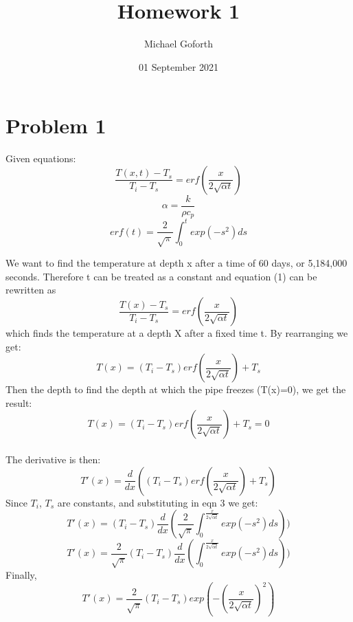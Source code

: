 \documentclass{article} %
\title{Homework 1} %
\author{Michael Goforth} %
\date{01 September 2021} %
\begin{document}
    \maketitle %
    
    \section{Problem 1} %
    
    Given equations: 
    \begin{equation} %
    \frac{T(x,t)-T_s}{T_i-T_s}=erf(\frac{x}{2\sqrt{\alpha t}})
    \end{equation}
    \begin{equation}
    \alpha = \frac{k}{\rho c_p}
    \end{equation}
    \begin{equation}
    erf(t) = \frac{2}{\sqrt{\pi}} \int_0^t exp(-s^2)ds
    \end{equation}
    
    
    We want to find the temperature at depth x after a time of 60 days, or 5,184,000 seconds.  Therefore t can be treated as a constant and equation (1) can be rewritten as
    \begin{equation}
    \frac{T(x)-T_s}{T_i-T_s}=erf(\frac{x}{2\sqrt{\alpha t}})
    \end{equation}
which finds the temperature at a depth X after a fixed time t.  By rearranging we get:
	\begin{equation}
    T(x)=(T_i-T_s) erf(\frac{x}{2\sqrt{\alpha t}})+T_s
    \end{equation}
Then the depth to find the depth at which the pipe freezes (T(x)=0), we get the result:
	\begin{equation}
    T(x)=(T_i-T_s) erf(\frac{x}{2\sqrt{\alpha t}})+T_s = 0
    \end{equation}
\\
The derivative is then:
	\begin{equation}
    T'(x)=\frac{d}{dx} ((T_i-T_s) erf(\frac{x}{2\sqrt{\alpha t}})+T_s)
    \end{equation}
    Since $T_i$, $T_s$ are constants, and substituting in eqn 3 we get:
    \begin{equation}
    T'(x)=(T_i-T_s) \frac{d}{dx} ( \frac{2}{\sqrt{\pi}} \int_0^{\frac{x}{2 \sqrt{\alpha t}}} exp(-s^2)ds))
    \end{equation}
    \begin{equation}
    T'(x)=\frac{2}{\sqrt{\pi}}(T_i-T_s) \frac{d}{dx} (  \int_0^{\frac{x}{2 \sqrt{\alpha t}}} exp(-s^2)ds))
    \end{equation}
    Finally,
    \begin{equation}
    T'(x)=\frac{2}{\sqrt{\pi}}(T_i-T_s) exp(-(\frac{x}{2 \sqrt{\alpha t}})^2)
    \end{equation}
    
\end{document}
